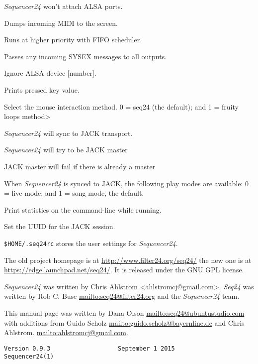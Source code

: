       \textsl{Sequencer24} won't attach ALSA ports.

      Dumps incoming MIDI to the screen.

      Runs at higher priority with FIFO scheduler.

      Passes any incoming SYSEX messages to all outputs.

      Ignore ALSA device [number].

      Prints pressed key value.

      Select the mouse interaction method.
      0 = seq24 (the default); and 1 = fruity loops method>

      \textsl{Sequencer24} will sync to JACK transport.

      \textsl{Sequencer24} will try to be JACK master

      JACK master will fail if there is already a master

      When \textsl{Sequencer24} is synced to JACK, the following play modes are
      available: 0 = live mode; and 1 = song mode, the default.

      Print statistics on the command-line while running.

      Set the UUID for the JACK session.

   \texttt{\$HOME/.seq24rc} stores the user settings for \textsl{Sequencer24}.

   The old project homepage is at
   \url{http://www.filter24.org/seq24/} the new
   one is at \url{https://edge.launchpad.net/seq24/}.
   It is released under the GNU GPL license.

   \textsl{Sequencer24} was written by Chris Ahlstrom <ahlstromcj@gmail.com>.
   \textsl{Seq24} was written by Rob C. Buse \url{mailto:seq24@filter24.org}
   and the \textsl{Sequencer24} team.

   This manual page was written by Dana Olson
   \url{mailto:seq24@ubuntustudio.com} with additions from Guido Scholz
   \url{mailto:guido.scholz@bayernline.de} and Chris Ahlstrom.
   \url{mailto:ahlstromcj@gmail.com}.

   \begin{verbatim}
Version 0.9.3                   September 1 2015                  Sequencer24(1)
   \end{verbatim}

